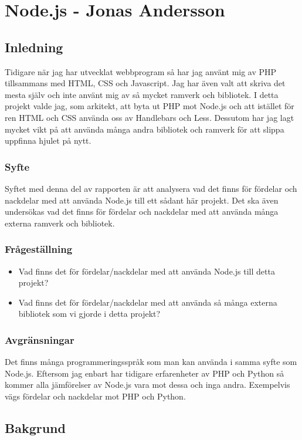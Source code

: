 \section{Node.js - Jonas Andersson}
\subsection{Inledning} 

Tidigare när jag har utvecklat webbprogram så har jag använt mig av PHP tillsammans med HTML, CSS och Javascript. Jag har även valt att skriva det mesta själv och inte använt mig av så mycket ramverk och bibliotek. I detta projekt valde jag, som arkitekt, att byta ut PHP mot Node.js och att istället för ren HTML och CSS använda oss av Handlebars och Less. Dessutom har jag lagt mycket vikt på att använda många andra bibliotek och ramverk för att slippa uppfinna hjulet på nytt.

\subsubsection{Syfte}

Syftet med denna del av rapporten är att analysera vad det finns för fördelar och nackdelar med att använda Node.js till ett sådant här projekt. Det ska även undersökas vad det finns för fördelar och nackdelar med att använda många externa ramverk och bibliotek.

\subsubsection{Frågeställning}
\begin{itemize}
	\item Vad finns det för fördelar/nackdelar med att använda Node.js till detta projekt?
	\item Vad finns det för fördelar/nackdelar med att använda så många externa bibliotek som vi gjorde i detta projekt?
\end{itemize}
\subsubsection{Avgränsningar}
Det finns många programmeringsspråk som man kan använda i samma syfte som Node.js. Eftersom jag enbart har tidigare erfarenheter av PHP och Python så kommer alla jämförelser av Node.js vara mot dessa och inga andra. Exempelvis vägs fördelar och nackdelar mot PHP och Python.
\subsection{Bakgrund}

